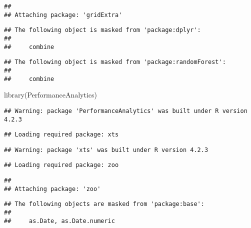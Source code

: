 \documentclass[
]{article}
\newenvironment{Shaded}{\begin{snugshade}}{\end{snugshade}}
\newcommand{\FunctionTok}[1]{\textcolor[rgb]{0.00,0.00,0.00}{#1}}
\newcommand{\NormalTok}[1]{#1}
\begin{document}
\begin{verbatim}
## 
## Attaching package: 'gridExtra'
\end{verbatim}

\begin{verbatim}
## The following object is masked from 'package:dplyr':
## 
##     combine
\end{verbatim}

\begin{verbatim}
## The following object is masked from 'package:randomForest':
## 
##     combine
\end{verbatim}

\begin{Shaded}
\begin{Highlighting}[]
\FunctionTok{library}\NormalTok{(PerformanceAnalytics)}
\end{Highlighting}
\end{Shaded}

\begin{verbatim}
## Warning: package 'PerformanceAnalytics' was built under R version 4.2.3
\end{verbatim}

\begin{verbatim}
## Loading required package: xts
\end{verbatim}

\begin{verbatim}
## Warning: package 'xts' was built under R version 4.2.3
\end{verbatim}

\begin{verbatim}
## Loading required package: zoo
\end{verbatim}

\begin{verbatim}
## 
## Attaching package: 'zoo'
\end{verbatim}

\begin{verbatim}
## The following objects are masked from 'package:base':
## 
##     as.Date, as.Date.numeric
\end{verbatim}
\end{document}
